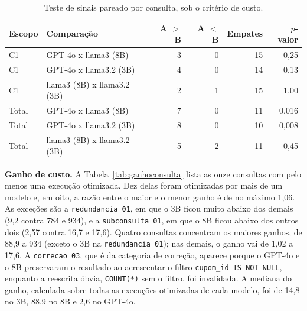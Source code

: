 \documentclass[12pt]{article}
\begin{document}
\begin{table}[!htb]
\centering
\caption{Teste de sinais pareado por consulta, sob o critério de custo.}
\label{tab:sinais}
\footnotesize
\begin{tabular}{llrrrr}
\hline
\textbf{Escopo} & \textbf{Comparação} & \textbf{A $>$ B} & \textbf{A $<$ B} & \textbf{Empates} & \textbf{$p$-valor} \\
\hline
C1 & GPT-4o x llama3 (8B) & 3 & 0 & 15 & 0,25 \\
C1 & GPT-4o x llama3.2 (3B) & 4 & 0 & 14 & 0,13 \\
C1 & llama3 (8B) x llama3.2 (3B) & 2 & 1 & 15 & 1,00 \\
Total & GPT-4o x llama3 (8B) & 7 & 0 & 11 & 0,016 \\
Total & GPT-4o x llama3.2 (3B) & 8 & 0 & 10 & 0,008 \\
Total & llama3 (8B) x llama3.2 (3B) & 5 & 2 & 11 & 0,45 \\
\hline
\end{tabular}
\end{table}

\textbf{Ganho de custo.} A Tabela~\ref{tab:ganhoconsulta} lista as onze consultas com pelo menos uma execução otimizada. Dez delas foram otimizadas por mais de um modelo e, em oito, a razão entre o maior e o menor ganho é de no máximo 1,06. As exceções são a \texttt{redundancia\_01}, em que o 3B ficou muito abaixo dos demais (9,2 contra 784 e 934), e a \texttt{subconsulta\_01}, em que o 8B ficou abaixo dos outros dois (2,57 contra 16,7 e 17,6). Quatro consultas concentram os maiores ganhos, de 88,9 a 934 (exceto o 3B na \texttt{redundancia\_01}); nas demais, o ganho vai de 1,02 a 17,6. A \texttt{correcao\_03}, que é da categoria de correção, aparece porque o GPT-4o e o 8B preservaram o resultado ao acrescentar o filtro \texttt{cupom\_id IS NOT NULL}, enquanto a reescrita óbvia, \texttt{COUNT(*)} sem o filtro, foi invalidada. A mediana do ganho, calculada sobre todas as execuções otimizadas de cada modelo, foi de 14,8 no 3B, 88,9 no 8B e 2,6 no GPT-4o.
\end{document}
